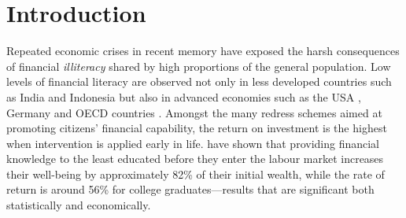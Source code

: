 \documentclass[a4paper,11pt,UKenglish,twoside,openright]{report}\usepackage[]{graphicx}\usepackage[]{color}
\begin{document}
\clearpage
\thispagestyle{empty}

\setcounter{page}{0} %


\chapter{Introduction}
\label{chp:1}



Repeated economic crises in recent memory have exposed the harsh consequences of financial \emph{illiteracy} shared by high proportions of the general population. Low levels of financial literacy are observed not only in less developed countries such as India and Indonesia \parencite{cole:2009} but also in advanced economies such as the USA \parencite{huston:2012}, Germany \parencite{bucherkoenen:2016} and OECD countries \parencite{lusardi:2015a}. Amongst the many redress schemes aimed at promoting citizens' financial capability, the return on investment is the highest when intervention is applied early in life. \textcite{lusardi:2014} have shown that providing financial knowledge to the least educated before they enter the labour market increases their well-being by approximately 82\% of their initial wealth, while the rate of return is around 56\% for college graduates---results that are significant both statistically and economically.
\end{document}
